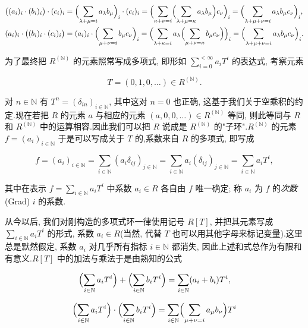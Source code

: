 \[
\begin{aligned}
\bigl((a_i)_i \cdot (b_i)_i\bigr) \cdot (c_i)_i
&= \Bigl(\sum_{\lambda + \mu = i} a_\lambda b_\mu\Bigr)_i \cdot (c_i)_i
 = \Bigl(\sum_{\kappa + \nu = i} \Bigl(\sum_{\lambda + \mu = \kappa} a_\lambda b_\mu\Bigr) c_\nu\Bigr)_i
 = \Bigl(\sum_{\lambda + \mu + \nu = i} a_\lambda b_\mu c_\nu\Bigr)_i, \\
(a_i)_i \cdot \bigl((b_i)_i \cdot (c_i)_i\bigr)
&= (a_i)_i \cdot \Bigl(\sum_{\mu + \nu = i} b_\mu c_\nu\Bigr)_i
 = \Bigl(\sum_{\lambda + \kappa = i} a_\lambda \Bigl(\sum_{\mu + \nu = \kappa} b_\mu c_\nu\Bigr)\Bigr)_i
 = \Bigl(\sum_{\lambda + \mu + \nu = i} a_\lambda b_\mu c_\nu\Bigr)_i\text{.}
\end{aligned}
\]

为了最终把 $R^{(\mathbb{N})}$ 的元素照常写成多项式, 即形如 $\sum_{i = 0}^{< \infty} a_i T^i$ 的表达式, 考察元素

\[
T = (0, 1, 0, \ldots) \in R^{(\mathbb{N})}\text{.}
\]

对 $n \in \mathbb{N}$ 有 $T^n = (\delta_{in})_{i \in \mathbb{N}}$, 其中这对 $n = 0$ 也正确, 这基于我们关于空乘积的约定.现在若把 $R$ 的元素 $a$ 与相应的元素 $(a, 0, 0, \ldots) \in R^{(\mathbb{N})}$ 等同, 则此等同与 $R$ 和 $R^{(\mathbb{N})}$ 中的运算相容.因此我们可以把 $R$ 说成是 $R^{(\mathbb{N})}$ 的"子环".$R^{(\mathbb{N})}$ 的元素 $f = (a_i)_{i \in \mathbb{N}}$ 于是可以写成关于 $T$ 的,系数来自 $R$ 的多项式, 即写成

\[
f = (a_i)_{i \in \mathbb{N}} = \sum_{i \in \mathbb{N}} (a_i \delta_{ij})_{j \in \mathbb{N}} = \sum_{i \in \mathbb{N}} a_i (\delta_{ij})_{j \in \mathbb{N}} = \sum_{i \in \mathbb{N}} a_i T^i,
\]

其中在表示 $f = \sum_{i \in \mathbb{N}} a_i T^i$ 中系数 $a_i \in R$ 各自由 $f$ 唯一确定; 称 $a_i$ 为 $f$ 的\emph{次数}(\textup{Grad}) $i$ 的系数.

从今以后, 我们对刚构造的多项式环一律使用记号 $R[T]$, 并把其元素写成 $\sum_{i \in \mathbb{N}} a_i T^i$ 的形式, 系数 $a_i \in R$(当然, 代替 $T$ 也可以用其他字母来标记变量).这里总是默然假定, 系数 $a_i$ 对几乎所有指标 $i \in \mathbb{N}$ 都消失, 因此上述和式总作为有限和有意义.$R[T]$ 中的加法与乘法于是由熟知的公式

\[
\Bigl(\sum_{i \in \mathbb{N}} a_i T^i\Bigr) + \Bigl(\sum_{i \in \mathbb{N}} b_i T^i\Bigr) = \sum_{i \in \mathbb{N}} (a_i + b_i) T^i,
\]

\[
\Bigl(\sum_{i \in \mathbb{N}} a_i T^i\Bigr) \cdot \Bigl(\sum_{i \in \mathbb{N}} b_i T^i\Bigr) = \sum_{i \in \mathbb{N}} \Bigl(\sum_{\mu + \nu = i} a_\mu b_\nu\Bigr) T^i
\]

